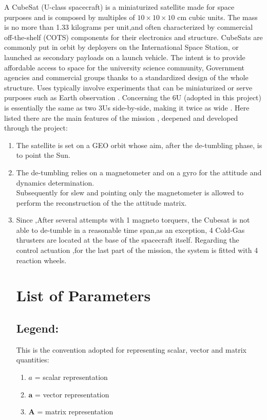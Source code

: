 \documentclass[11pt]{article}
\begin{document}
A CubeSat (U-class spacecraft) is a  miniaturized satellite  made for space purposes and is composed by  multiples of $10\times10\times10$ cm cubic units. The mass is no more than 1.33 kilograms per unit,and often characterized by commercial off-the-shelf (COTS) components for their electronics and structure. CubeSats are commonly put in orbit by deployers on the International Space Station, or launched as secondary payloads on a launch vehicle. The intent is to  provide  affordable  access  to  space  for  the  university  science  community, Government agencies and commercial groups thanks to a standardized design of the whole structure. Uses typically involve experiments that can be miniaturized or serve purposes such as Earth observation \cite{intro}. Concerning the 6U (adopted in this project) is essentially the same as two 3Us side-by-side, making it twice as wide . Here listed there are the main features of the mission ,  deepened and developed through the project:
\begin{enumerate}
\item The satellite is set on a GEO orbit whose aim, after the de-tumbling phase, is to point the Sun.
\item The de-tumbling relies on a magnetometer and on a gyro for the attitude and dynamics determination.\\ Subsequently for slew and pointing only the magnetometer is allowed to perform the reconstruction of the the attitude matrix.
 \item Since ,After several attempts with 1 magneto torquers, the Cubesat is not able to de-tumble in a reasonable time span,as an exception, 4 Cold-Gas thrusters are located at the base of the spacecraft itself.
Regarding the control actuation ,for the last part of the mission, the system is fitted  with 4 reaction wheels.

\clearpage
\section{List of Parameters}

\subsection{Legend:}
This is the convention adopted for representing scalar, vector and matrix quantities:
\begin{multicols}{3}
\begin{enumerate}
    \item $a$ = scalar representation
    \item $\mathbf{a}$ = vector representation
   \item $\mathbf{A}$ = matrix representation
\end{enumerate}
\end{multicols}
\end{enumerate}
\end{document}
